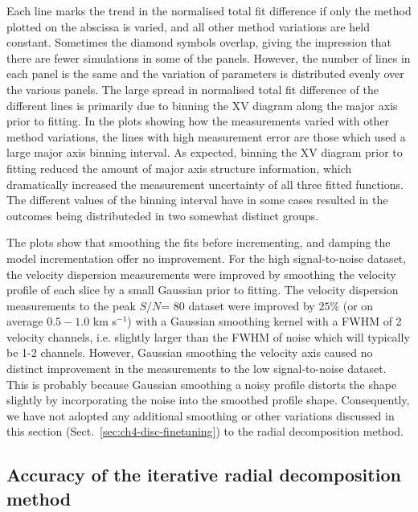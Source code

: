 \documentclass[traditabstract]{aa} %
\newcommand\kms{km s$^{-1}$}
\begin{document}
Each line marks the trend in the normalised total fit difference if 
only the method
plotted on the abscissa is varied, and all other method variations are 
held constant. Sometimes the diamond symbols overlap, giving the impression that
there are fewer simulations in some of the panels. However, the number of
lines in each panel is the same and the variation of parameters is
distributed evenly over the various panels. The large spread in normalised
total fit difference of the different lines is primarily due to
binning the XV diagram along the major axis prior to fitting. In the 
plots showing
how the measurements varied with other method variations, the lines
with high measurement error are those which used a large major axis
binning interval. As expected, binning the XV diagram prior to fitting reduced 
the amount of major axis structure information, which dramatically increased 
the measurement uncertainty of all three fitted functions. The different
values of the binning interval have in some cases resulted in the outcomes being
distributeded in two somewhat distinct groups.

The plots show that smoothing the fits before incrementing, and
damping the model incrementation offer no improvement. For the high 
signal-to-noise dataset, the velocity dispersion measurements were 
improved by smoothing the velocity profile of each slice
by a small Gaussian prior to fitting.  The velocity dispersion 
measurements to the peak $S/N$= 80 dataset
were improved by $25\%$ (or on average $0.5-1.0$
\kms) with a Gaussian smoothing kernel with a FWHM of 2 velocity
channels, i.e.  slightly larger than the FWHM of noise which will
typically be 1-2 channels. However, Gaussian smoothing the velocity
axis caused no distinct improvement in the measurements to the low
signal-to-noise dataset. This is probably because Gaussian smoothing a
noisy profile distorts the shape slightly by incorporating the noise
into the smoothed profile shape.  
Consequently, we have not adopted
any additional smoothing or other variations discussed in this
section (Sect.~\ref{sec:ch4-disc-finetuning}) to the radial
decomposition method.

\subsection{Accuracy of the iterative radial decomposition method}
\label{sec:ch4-accuracy}
\end{document}
